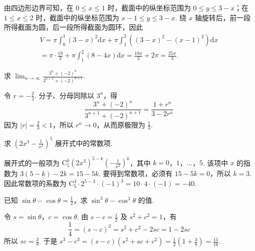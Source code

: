 \begin{solution}
由四边形边界可知，在 \(0\leq x\leq 1\) 时，截面中的纵坐标范围为 \(0\leq y\leq 3-x\)；在 \(1\leq x\leq 2\) 时，截面中的纵坐标范围为 \(x-1\leq y\leq 3-x\). 绕 \(x\) 轴旋转后，前一段所得截面为圆，后一段所得截面为圆环，因此
\[
\begin{gathered}
V=\pi\int_0^1(3-x)^2\mathrm{d}x+\pi\int_1^2\left((3-x)^2-(x-1)^2\right)\mathrm{d}x\\
=\pi\cdot\frac{19}{3}+\pi\int_1^2(8-4x)\mathrm{d}x
=\frac{19\pi}{3}+2\pi=\frac{25\pi}{3}.
\end{gathered}
\]
\end{solution}

\begin{problem}

求 \(\displaystyle\lim_{n \to \infty}\frac{3^n + (-2)^n}{3^{n + 1} + (-2)^{n + 1}}\).
\end{problem}

\begin{solution}
令 \(r=-\frac{2}{3}\). 分子、分母同除以 \(3^n\)，得
\[
\frac{3^n+(-2)^n}{3^{n+1}+(-2)^{n+1}}=\frac{1+r^n}{3-2r^n}
\]
因为 \(\lvert r\rvert=\frac{2}{3}<1\)，所以 \(r^n\to0\)，从而原极限为 \(\frac{1}{3}\).
\end{solution}

\begin{problem}

求 \(\left(2x^3 - \frac{1}{x^2}\right)^5\) 展开式中的常数项.
\end{problem}

\begin{solution}
展开式的一般项为 \(\mathrm C_5^k(2x^3)^{5-k}\left(-\frac{1}{x^2}\right)^k\)，其中 \(k=0\)，\(1\)，\(\ldots\)，\(5\). 该项中 \(x\) 的指数为 \(3(5-k)-2k=15-5k\). 要得到常数项，必须有 \(15-5k=0\)，所以 \(k=3\). 因此常数项的系数为
\(\mathrm C_5^3\cdot2^{5-3}\cdot(-1)^3=10\cdot4\cdot(-1)=-40\).
\end{solution}

\begin{problem}

已知 \(\sin \theta - \cos \theta = \frac{1}{2}\)，求 \(\sin^3 \theta - \cos^3 \theta\) 的值.
\end{problem}

\begin{solution}
令 \(s=\sin\theta\)，\(c=\cos\theta\). 由 \(s-c=\frac{1}{2}\) 及 \(s^2+c^2=1\)，有
\[
\frac{1}{4}=(s-c)^2=s^2+c^2-2sc=1-2sc
\]
所以 \(sc=\frac{3}{8}\). 于是
\(s^3-c^3=(s-c)(s^2+sc+c^2)=\frac{1}{2}\left(1+\frac{3}{8}\right)=\frac{11}{16}\).
\end{solution}

